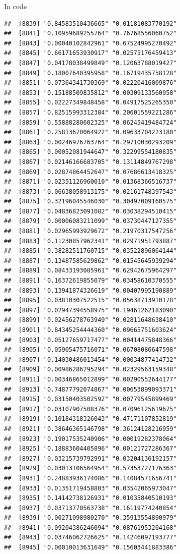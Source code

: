 \documentclass[ignorenonframetext,]{beamer}
\begin{document}
\begin{frame}[fragile]{In code}
\begin{verbatim}
##  [8839] "0.84583510436665" "0.01181083770192"
##  [8841] "0.10959689255764" "0.76768556060752"
##  [8843] "0.00040102842961" "0.67524995270492"
##  [8845] "0.66171653930917" "0.02575176459413"
##  [8847] "0.04178038499849" "0.12063788019427"
##  [8849] "0.18007640395958" "0.16719435758128"
##  [8851] "0.07364341730369" "0.02220416009876"
##  [8853] "0.15188509835812" "0.00309133560058"
##  [8855] "0.02227349848458" "0.04917525265350"
##  [8857] "0.82515993312384" "0.20601559221286"
##  [8859] "0.55888280602325" "0.06245419484724"
##  [8861] "0.25813670064922" "0.09633704223180"
##  [8863] "0.00246976763764" "0.29710030293209"
##  [8865] "0.00052081944647" "0.32299554180835"
##  [8867] "0.02146166683705" "0.13114849767298"
##  [8869] "0.02874864452647" "0.07686613418325"
##  [8871] "0.02351126960010" "0.01368366516737"
##  [8873] "0.06638058913175" "0.02161748397543"
##  [8875] "0.32196045546030" "0.30497009160575"
##  [8877] "0.04836823091082" "0.03038294510415"
##  [8879] "0.00006083211099" "0.03730447127355"
##  [8881] "0.02965993929672" "0.21970317547256"
##  [8883] "0.11230857962341" "0.02971951793887"
##  [8885] "0.38282511760715" "0.03522896064144"
##  [8887] "0.13487585629862" "0.01545645939294"
##  [8889] "0.08433193085961" "0.62942675964297"
##  [8891] "0.16372619855079" "0.03458610370555"
##  [8893] "0.13941874326619" "0.00407995190889"
##  [8895] "0.03810307522515" "0.05638713910178"
##  [8897] "0.02947394558975" "0.19461262183090"
##  [8899] "0.02456278763949" "0.02811648638410"
##  [8901] "0.84345254444360" "0.09665751603624"
##  [8903] "0.05127659717477" "0.00414475848366"
##  [8905] "0.05905475716071" "0.06708086647598"
##  [8907] "0.14030486013454" "0.00034877414732"
##  [8909] "0.00986286295294" "0.02329563159348"
##  [8911] "0.00346865012899" "0.00290552644177"
##  [8913] "0.74877792074867" "0.00653899093371"
##  [8915] "0.03150403502592" "0.00779545899469"
##  [8917] "0.03107907508376" "0.07096125619675"
##  [8919] "0.10184318326043" "0.47171107852819"
##  [8921] "0.38646365146798" "0.36124128216959"
##  [8923] "0.19017535240906" "0.00019282378064"
##  [8925] "0.18883604405896" "0.00121727286367"
##  [8927] "0.03215739792991" "0.03204136192157"
##  [8929] "0.03013106564954" "0.57353727176363"
##  [8931] "0.24883936174086" "0.14084571656741"
##  [8933] "0.01351719458803" "0.03542065973047"
##  [8935] "0.14142738126931" "0.01035840510193"
##  [8937] "0.03713770563738" "0.16119774240854"
##  [8939] "0.00271098980270" "0.35913554890979"
##  [8941] "0.09204386246094" "0.08761953204168"
##  [8943] "0.03746062726625" "0.14246097193777"
##  [8945] "0.00010013631649" "0.15603441883386"

\end{verbatim}
\end{frame}
\end{document}
